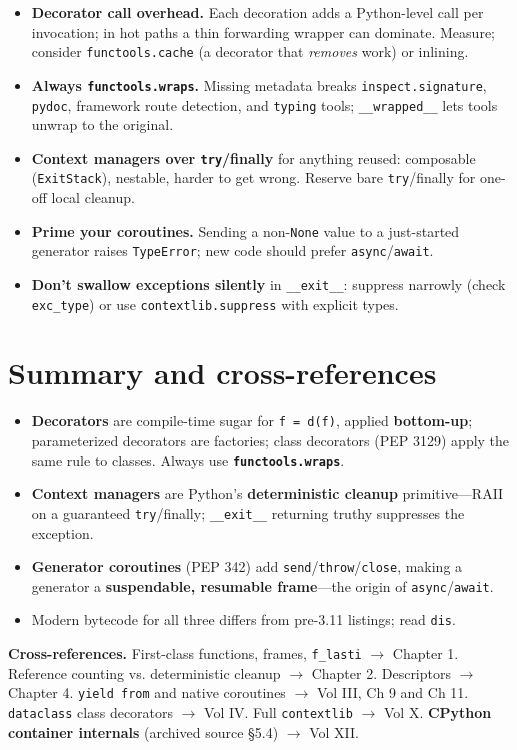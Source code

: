 \begin{itemize}
  \item \textbf{Decorator call overhead.} Each decoration adds a Python-level call per
    invocation; in hot paths a thin forwarding wrapper can dominate. Measure; consider
    \texttt{functools.cache} (a decorator that \emph{removes} work) or inlining.
  \item \textbf{Always \texttt{functools.wraps}.} Missing metadata breaks
    \texttt{inspect.signature}, \texttt{pydoc}, framework route detection, and \texttt{typing}
    tools; \texttt{\_\_wrapped\_\_} lets tools unwrap to the original.
  \item \textbf{Context managers over \texttt{try}/finally} for anything reused: composable
    (\texttt{ExitStack}), nestable, harder to get wrong. Reserve bare \texttt{try}/finally for
    one-off local cleanup.
  \item \textbf{Prime your coroutines.} Sending a non-\texttt{None} value to a just-started
    generator raises \texttt{TypeError}; new code should prefer \texttt{async}/\texttt{await}.
  \item \textbf{Don't swallow exceptions silently} in \texttt{\_\_exit\_\_}: suppress narrowly
    (check \texttt{exc\_type}) or use \texttt{contextlib.suppress} with explicit types.
\end{itemize}

\section{Summary and cross-references}

\begin{itemize}
  \item \textbf{Decorators} are compile-time sugar for \texttt{f = d(f)}, applied
    \textbf{bottom-up}; parameterized decorators are factories; class decorators (PEP 3129)
    apply the same rule to classes. Always use \textbf{\texttt{functools.wraps}}.
  \item \textbf{Context managers} are Python's \textbf{deterministic cleanup}
    primitive---RAII on a guaranteed \texttt{try}/finally; \texttt{\_\_exit\_\_} returning
    truthy suppresses the exception.
  \item \textbf{Generator coroutines} (PEP 342) add \texttt{send}/\texttt{throw}/\texttt{close},
    making a generator a \textbf{suspendable, resumable frame}---the origin of
    \texttt{async}/\texttt{await}.
  \item Modern bytecode for all three differs from pre-3.11 listings; read \texttt{dis}.
\end{itemize}

\textbf{Cross-references.} First-class functions, frames, \texttt{f\_lasti} $\rightarrow$
Chapter 1. Reference counting vs. deterministic cleanup $\rightarrow$ Chapter 2. Descriptors
$\rightarrow$ Chapter 4. \texttt{yield from} and native coroutines $\rightarrow$ Vol III, Ch 9
and Ch 11. \texttt{dataclass} class decorators $\rightarrow$ Vol IV. Full \texttt{contextlib}
$\rightarrow$ Vol X. \textbf{CPython container internals} (archived source §5.4) $\rightarrow$
Vol XII.
